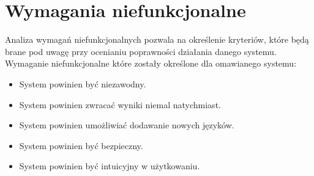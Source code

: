\noindent
\begin{minipage}{\linewidth}
\label{use-case}
\end{minipage}


\section{Wymagania niefunkcjonalne}
\label{sec:wymaganiaNiefunkcjonalne}
Analiza wymagań niefunkcjonalnych pozwala na określenie kryteriów, które będą brane pod uwagę przy ocenianiu poprawności działania danego systemu. \\
Wymaganie niefunkcjonalne które zostały określone dla omawianego systemu:
\begin{itemize}
\item System powinien być niezawodny.
\item System powinien zwracać wyniki niemal natychmiast.
\item System powinien umożliwiać dodawanie nowych języków.
\item System powinien być bezpieczny.
\item System powinien być intuicyjny w użytkowaniu.
\end{itemize}

